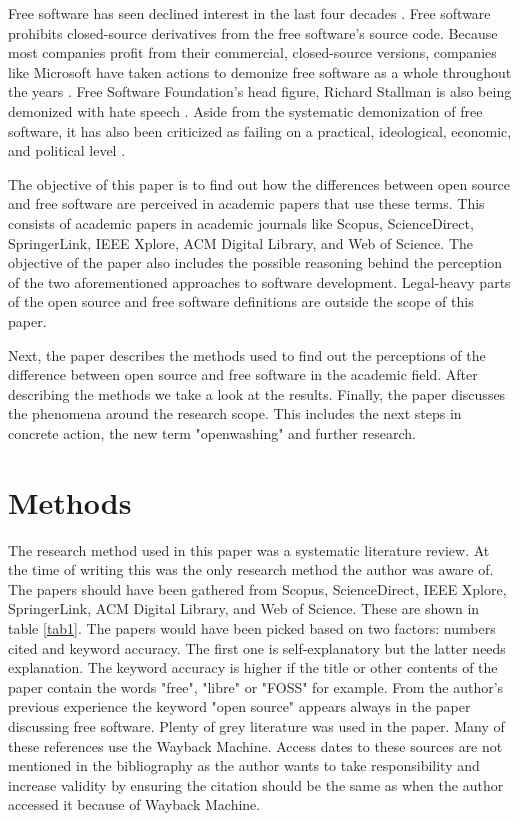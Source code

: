 \documentclass[conference]{IEEEtran}
\begin{document}
Free software has seen declined interest in the last four decades \cite{declinewiki}. Free software prohibits closed-source derivatives from the free software's source code. Because most companies profit from their commercial, closed-source versions, companies like Microsoft have taken actions to demonize free software as a whole throughout the years \cite{mundie}. Free Software Foundation's head figure, Richard Stallman is also being demonized with hate speech \cite{supportrms}. Aside from the systematic demonization of free software, it has also been criticized as failing on a practical, ideological, economic, and political level \cite{critfree}.

The objective of this paper is to find out how the differences between open source and free software are perceived in academic papers that use these terms. This consists of academic papers in academic journals like Scopus, ScienceDirect, SpringerLink, IEEE Xplore, ACM Digital Library, and Web of Science. The objective of the paper also includes the possible reasoning behind the perception of the two aforementioned approaches to software development. Legal-heavy parts of the open source and free software definitions are outside the scope of this paper.

Next, the paper describes the methods used to find out the perceptions of the difference between open source and free software in the academic field. After describing the methods we take a look at the results. Finally, the paper discusses the phenomena around the research scope. This includes the next steps in concrete action, the new term "openwashing" and further research.

\section{Methods}
The research method used in this paper was a systematic literature review. At the time of writing this was the only research method the author was aware of. The papers should have been gathered from Scopus, ScienceDirect, IEEE Xplore, SpringerLink, ACM Digital Library, and Web of Science. These are shown in table \ref{tab1}. The papers would have been picked based on two factors: numbers cited and keyword accuracy. The first one is self-explanatory but the latter needs explanation. The keyword accuracy is higher if the title or other contents of the paper contain the words "free", "libre" or "FOSS" for example. From the author's previous experience the keyword "open source" appears always in the paper discussing free software. Plenty of grey literature was used in the paper. Many of these references use the Wayback Machine. Access dates to these sources are not mentioned in the bibliography as the author wants to take responsibility and increase validity by ensuring the citation should be the same as when the author accessed it because of Wayback Machine.
\end{document}
